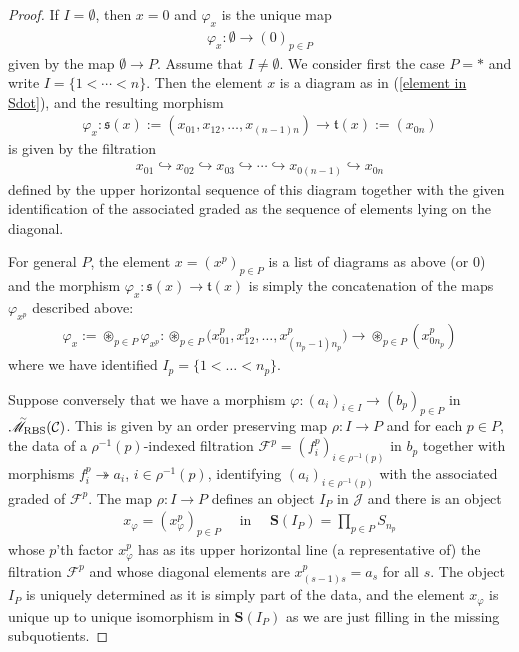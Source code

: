 \documentclass[12pt, reqno]{amsart}
\theoremstyle{plain}
\theoremstyle{definition}
\renewcommand{\phi}{\varphi}
\begin{document}
\begin{proof}
If $I=\emptyset$, then $x=0$ and $\phi_x$ is the unique map
\begin{align*}
\phi_x\colon \emptyset \rightarrow (0)_{p\in P}
\end{align*}
given by the map $\emptyset\rightarrow P$. Assume that $I\neq \emptyset$. We consider first the case $P=\ast$ and write $I=\{1<\cdots <n\}$. Then the element $x$ is a diagram as in (\ref{element in Sdot}), and the resulting morphism
\begin{align*}
\phi_x\colon \mathfrak{s}(x):=(x_{01},x_{12},\ldots,x_{(n-1)n})\longrightarrow \mathfrak{t}(x):=(x_{0n})
\end{align*}
is given by the filtration
\begin{align*}
x_{01} \hookrightarrow x_{02} \hookrightarrow x_{03} \hookrightarrow \cdots \hookrightarrow x_{0(n-1)} \hookrightarrow x_{0n}
\end{align*}
defined by the upper horizontal sequence of this diagram together with the given identification of the associated graded as the sequence of elements lying on the diagonal.

For general $P$, the element $x=(x^p)_{p\in P}$ is a list of diagrams as above (or $0$) and the morphism $\phi_x\colon \mathfrak{s}(x)\rightarrow \mathfrak{t}(x)$ is simply the concatenation of the maps $\phi_{x^p}$ described above:
\begin{align*}
\phi_x:=\mathop{\circledast}_{p\in P} \phi_{x^p}\colon \mathop{\circledast}_{p\in P} \big(x^p_{01}, x^p_{12}, \ldots, x^p_{(n_p-1)n_p}\big)\longrightarrow \mathop{\circledast}_{p\in P} (x^p_{0n_p})
\end{align*}
where we have identified $I_p=\{1<\ldots<n_p\}$.

Suppose conversely that we have a morphism $\phi\colon (a_i)_{i\in I}\rightarrow (b_p)_{p\in P}$ in $\accentset{\sim}{\mathscr{M}}_{\operatorname{RBS}}(\mathcal{C})$. This is given by an order preserving map $\rho\colon I\rightarrow P$ and for each $p\in P$, the data of a $\rho^{-1}(p)$-indexed filtration $\mathcal{F}^p =(f^p_i)_{i\in \rho^{-1}(p)}$ in $b_p$ together with morphisms $f^p_i\twoheadrightarrow a_i$, $i\in \rho^{-1}(p)$, identifying $(a_i)_{i\in \rho^{-1}(p)}$ with the associated graded of $\mathcal{F}^p$. The map $\rho\colon I \rightarrow P$ defines an object $I_P$ in $\mathcal{J}$ and there is an object
\begin{align*}
x_\phi=(x_\phi^p)_{p\in P}\quad\text{ in }\quad\mathbf{S}(I_P)=\prod_{p\in P}S_{n_p}
\end{align*}
whose $p$'th factor $x_\phi^p$ has as its upper horizontal line (a representative of) the filtration $\mathcal{F}^p$ and whose diagonal elements are $x^p_{(s-1)s}=a_s$ for all $s$. The object $I_P$ is uniquely determined as it is simply part of the data, and the element $x_\phi$ is unique up to unique isomorphism in $\mathbf{S}(I_P)$ as we are just filling in the missing subquotients.
\end{proof}
\end{document}
